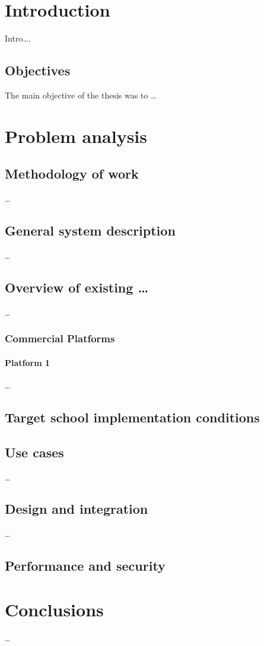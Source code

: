 \chapter{Introduction}
Intro\ldots.

\section{Objectives}
\label{sec:Objectives}
The main objective of the thesis was to \ldots

\chapter{Problem analysis}
\label{chap:Problemanalysis}

\section{Methodology of work}
\ldots


\section{General system description}
\label{sec:Problemanalysis}
\ldots

\section{Overview of existing \ldots}
\ldots

\subsection{Commercial Platforms}
\label{sec:commercial_platforms}

\subsubsection{Platform 1}
\ldots


\section{Target school implementation conditions}

\section{Use cases}
\ldots

\section{Design and integration}
\ldots

\section{Performance and security}
\label{sec:performandsec}

\chapter{Conclusions}
\ldots